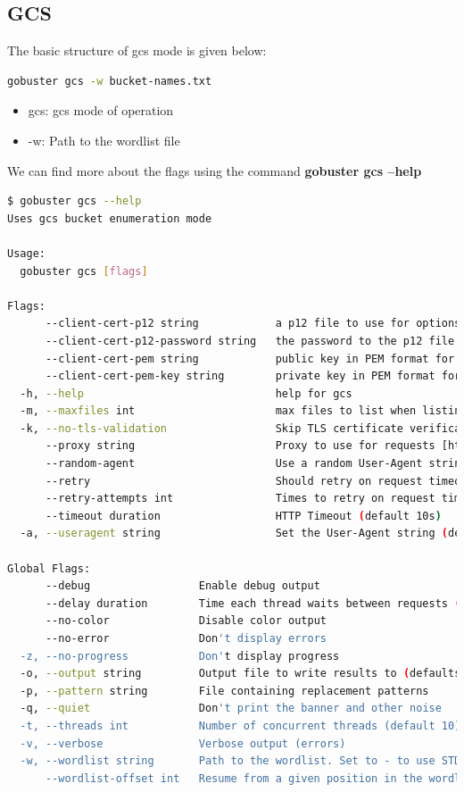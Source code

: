 \documentclass[12 pt]{article}
\begin{document}
\subsection{GCS}
The basic structure of gcs mode is given below:
\begin{lstlisting}[language=bash]
gobuster gcs -w bucket-names.txt
\end{lstlisting}
\begin{itemize}
    \item gcs: gcs mode of operation
    \item -w: Path to the wordlist file 
\end{itemize}
We can find more about the flags using the command \textbf{gobuster gcs --help}
\begin{lstlisting}[language=bash]
$ gobuster gcs --help                                                                                                                                                  
Uses gcs bucket enumeration mode

Usage:
  gobuster gcs [flags]

Flags:
      --client-cert-p12 string            a p12 file to use for options TLS client certificates
      --client-cert-p12-password string   the password to the p12 file
      --client-cert-pem string            public key in PEM format for optional TLS client certificates
      --client-cert-pem-key string        private key in PEM format for optional TLS client certificates (this key needs to have no password)
  -h, --help                              help for gcs
  -m, --maxfiles int                      max files to list when listing buckets (only shown in verbose mode) (default 5)
  -k, --no-tls-validation                 Skip TLS certificate verification
      --proxy string                      Proxy to use for requests [http(s)://host:port] or [socks5://host:port]
      --random-agent                      Use a random User-Agent string
      --retry                             Should retry on request timeout
      --retry-attempts int                Times to retry on request timeout (default 3)
      --timeout duration                  HTTP Timeout (default 10s)
  -a, --useragent string                  Set the User-Agent string (default "gobuster/3.6")

Global Flags:
      --debug                 Enable debug output
      --delay duration        Time each thread waits between requests (e.g. 1500ms)
      --no-color              Disable color output
      --no-error              Don't display errors
  -z, --no-progress           Don't display progress
  -o, --output string         Output file to write results to (defaults to stdout)
  -p, --pattern string        File containing replacement patterns
  -q, --quiet                 Don't print the banner and other noise
  -t, --threads int           Number of concurrent threads (default 10)
  -v, --verbose               Verbose output (errors)
  -w, --wordlist string       Path to the wordlist. Set to - to use STDIN.
      --wordlist-offset int   Resume from a given position in the wordlist (defaults to 0)
\end{lstlisting}
\end{document}
